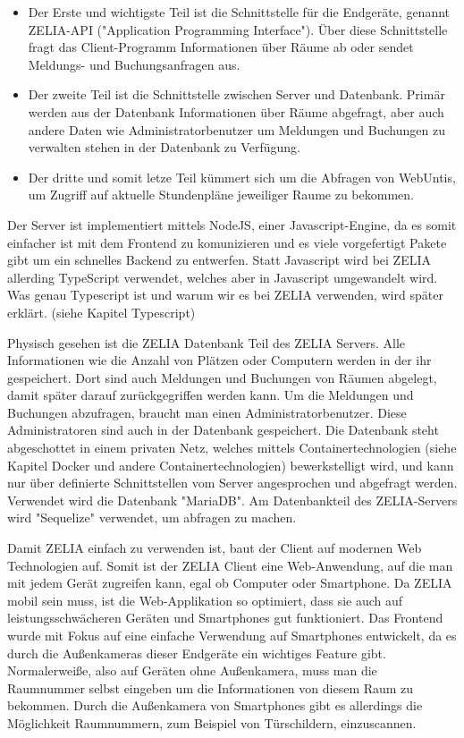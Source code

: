 \begin{itemize}
    \item Der Erste und wichtigste Teil ist die Schnittstelle für die Endgeräte, genannt ZELIA-API ("Application Programming Interface"). Über diese Schnittstelle fragt das Client-Programm Informationen über Räume ab oder sendet Meldungs- und Buchungsanfragen aus.
    \item Der zweite Teil ist die Schnittstelle zwischen Server und Datenbank. Primär werden aus der Datenbank Informationen über Räume abgefragt, aber auch andere Daten wie Administratorbenutzer um Meldungen und Buchungen zu verwalten stehen in der Datenbank zu Verfügung. 
    \item Der dritte und somit letze Teil kümmert sich um die Abfragen von WebUntis, um Zugriff auf aktuelle Stundenpläne jeweiliger Raume zu bekommen.
\end{itemize}

Der Server ist implementiert mittels NodeJS, einer Javascript-Engine, da es somit einfacher ist mit dem Frontend zu komunizieren und es viele vorgefertigt Pakete gibt um ein schnelles Backend zu entwerfen. Statt Javascript wird bei ZELIA allerding TypeScript verwendet, welches aber in Javascript umgewandelt wird. Was genau Typescript ist und warum wir es bei ZELIA verwenden, wird später erklärt. (siehe Kapitel Typescript)


Physisch gesehen ist die ZELIA Datenbank Teil des ZELIA Servers. Alle Informationen wie die Anzahl von Plätzen oder Computern werden in der ihr gespeichert. Dort sind auch Meldungen und Buchungen von Räumen abgelegt, damit später darauf zurückgegriffen werden kann. Um die Meldungen und Buchungen abzufragen, braucht man einen Administratorbenutzer. Diese Administratoren sind auch in der Datenbank gespeichert. Die Datenbank steht abgeschottet in einem privaten Netz, welches mittels Containertechnologien (siehe Kapitel Docker und andere Containertechnologien) bewerkstelligt wird, und kann nur über definierte Schnittstellen vom Server angesprochen und abgefragt werden. Verwendet wird die Datenbank "MariaDB". Am Datenbankteil des ZELIA-Servers wird "Sequelize" verwendet, um abfragen zu machen.


Damit ZELIA einfach zu verwenden ist, baut der Client auf modernen Web Technologien auf. Somit ist der ZELIA Client eine Web-Anwendung, auf die man mit jedem Gerät zugreifen kann, egal ob Computer oder Smartphone. Da ZELIA mobil sein muss, ist die Web-Applikation so optimiert, dass sie auch auf leistungsschwächeren Geräten und Smartphones gut funktioniert. Das Frontend wurde mit Fokus auf eine einfache Verwendung auf Smartphones entwickelt, da es durch die Außenkameras dieser Endgeräte ein wichtiges Feature gibt. Normalerweiße, also auf Geräten ohne Außenkamera, muss man die Raumnummer selbst eingeben um die Informationen von diesem Raum zu bekommen. Durch die Außenkamera von Smartphones gibt es allerdings die Möglichkeit Raumnummern, zum Beispiel von Türschildern, einzuscannen. 

